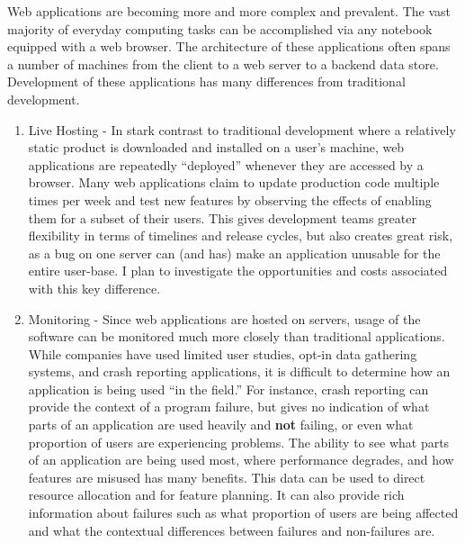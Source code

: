 \documentclass[10pt]{article}
\begin{document}
\begin{small}
\begin{enumerate}
\end{enumerate}

Web applications are becoming more and more complex and prevalent.  The vast
majority of everyday computing tasks can be accomplished via any notebook
equipped with a web browser.  The architecture of these applications often spans a number of
machines from the client to a web server to a backend data store.  Development of these
applications has many differences from traditional development.

\begin{enumerate}

\item Live Hosting - 
    In stark contrast to traditional development where a relatively static
    product is downloaded and installed on a user's machine, web applications are repeatedly ``deployed''
    whenever they are accessed by a browser.  Many web applications 
    claim to update production code multiple times per week and 
    test new features by observing the effects of enabling them for a subset of their users. 
    This gives development teams greater flexibility in terms of timelines and release cycles, but
    also creates great risk, as a bug on one server can (and has) make an application unusable
    for the entire user-base.
    I plan to investigate the opportunities and costs associated with this key difference.

\item Monitoring - Since web applications are hosted on servers, usage of the software
    can be monitored much more closely than traditional applications.  While companies have used limited
    user studies, opt-in data gathering systems, and crash reporting applications, it is difficult
    to determine how an application is being used ``in the field.'' For instance, crash reporting
    can provide the context of a program failure, but gives no indication of what parts of an application
    are used heavily and \textbf{not} failing, or even what proportion of users are experiencing problems.
    The ability to see what parts of an application are being used most, where
    performance degrades, and how features are misused has many benefits.  
    This data can be used to direct resource allocation and for
    feature planning.  It can also provide rich information about failures such as what proportion of users 
    are being affected and what the contextual differences between failures and non-failures are.

\end{enumerate}


\end{small}
\end{document}
